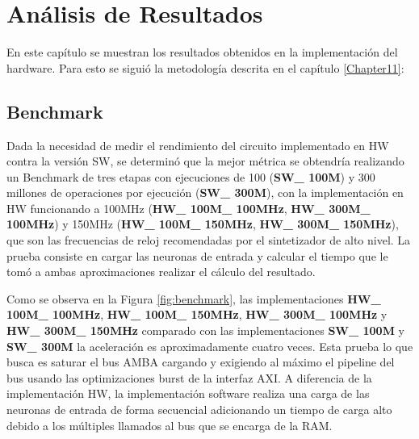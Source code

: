 
\chapter{Análisis de Resultados} %
\label{Chapter14}

En este capítulo se muestran los resultados obtenidos en la implementación del hardware. Para esto se siguió la metodología descrita en el capítulo \ref{Chapter11}: 
 
 \section{Benchmark}
Dada la necesidad de medir el rendimiento del circuito implementado en HW contra la versión SW, se determinó que la mejor métrica se obtendría realizando un Benchmark de tres etapas con ejecuciones de 100 (\textbf{SW\_ 100M}) y 300 millones de operaciones por ejecución (\textbf{SW\_ 300M}), con la implementación en HW funcionando a 100MHz (\textbf{HW\_ 100M\_ 100MHz}, \textbf{HW\_ 300M\_ 100MHz}) y 150MHz (\textbf{HW\_ 100M\_ 150MHz}, \textbf{HW\_ 300M\_ 150MHz}), que son las frecuencias de reloj recomendadas por el sintetizador de alto nivel. La prueba consiste en cargar las neuronas de entrada y calcular el tiempo que le tomó a ambas aproximaciones realizar el cálculo del resultado.

Como se observa en la Figura \ref{fig:benchmark}, las implementaciones \textbf{HW\_ 100M\_ 100MHz}, \textbf{HW\_ 100M\_ 150MHz}, \textbf{HW\_ 300M\_ 100MHz} y \textbf{HW\_ 300M\_ 150MHz} comparado con las implementaciones \textbf{SW\_ 100M} y \textbf{SW\_ 300M} la aceleración es aproximadamente cuatro veces. Esta prueba lo que busca es saturar el bus AMBA cargando y exigiendo al máximo el pipeline del bus usando las optimizaciones burst de la interfaz AXI. A diferencia de la implementación HW, la implementación software realiza una carga de las neuronas de entrada de forma secuencial adicionando un tiempo de carga alto debido a los múltiples llamados al bus que se encarga de la RAM.


